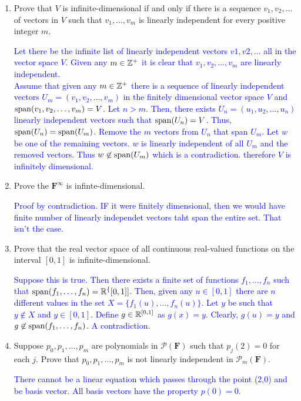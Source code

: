 \documentclass[10pt,a4paper]{report}
\newcommand{\BLUE}[1]{\textcolor{blue}{#1}}
\newcommand{\F}{\textbf{F}}
\begin{document}
\begin{enumerate}
\item Prove that $V$ is infinite-dimensional if and only if there is a sequence $v_1,v_2, \dots$ of vectors in $V$ such that $v_1, \dots, v_m$ is linearly independent for every positive integer $m$.

\BLUE{\IF Let there be the infinite list of linearly independent vectors $v1,v2,\dots$ all in the vector space $V$.  Given any $m \in \mathbb{Z}^+$ it is clear that $v_1,v_2,\dots,v_m$ are linearly independent.
\\ 
\ONLYIF Assume that given any $m \in \mathbb{Z}^+$ there is a sequence of linearly independent vectors $U_m=(v_1,v_2,\dots, v_m)$ in the finitely dimensional vector space $V$ and $\operatorname{span}(v_1,v_2,\dots,v_m)=V$. Let $n>m$.  Then, there exists $U_n=(u_1,u_2,\dots, u_n)$ linearly independent vectors such that $\operatorname{span}(U_n)=V$.  Thus, $\operatorname{span}(U_n)=\operatorname{span}(U_m)$. Remove the $m$ vectors from $U_n$ that span $U_m$.  Let $w$ be one of the remaining vectors.  $w$ is linearly independent of all $U_m$ and the removed vectors.  Thus $w \not\in \operatorname{span}(U_m)$ which is a contradiction.  therefore $V$ is infinitely dimensional.
}

\item Prove the $\F^\infty$ is infinte-dimensional.

\BLUE{Proof by contradiction.  IF it were finitely dimensional, then we would have finite number of linearly independet vectors taht span the entire set.  That isn't the case.
}

\item Prove that the real vector space of all continuous real-valued functions on the interval $[0,1]$ is infinite-dimensional.

\BLUE{Suppose this is true.  Then there exists a finite set of functions $f_1, \dots, f_n$ such that $\operatorname{span}(f_1, \dots,f_n) = \mathbb{R}^\{[0,1]]$.  Then, given any $u \in [0,1]$ there are $n$ different values in the set $X= \{f_1(u), \dots, f_n(u)\}$.  Let $y$ be such that $y \not \in X$ and $y \in [0,1]$.  Define $g \in \mathbb{R}^{[0,1]}$ as $g(x)=y$.  Clearly, $g(u)=y$ and $g \not \in \operatorname{span}(f_1,\dots, f_n)$.  A contradiction.
}

\item Suppose $p_0, p_1, \dots, p_m$ are polynomials in $\mathcal{P}(\F)$ such that $p_j(2)=0$ for each $j$.  Prove that $p_0, p_1, \dots, p_m$ is not linearly independent in $\mathcal{P}_m(\F)$.

\BLUE{There cannot be a linear equation which passes through the point (2,0) and be basis vector.  All basis vectors have the property $p(0)=0$.
}

\end{enumerate}
\end{document}
